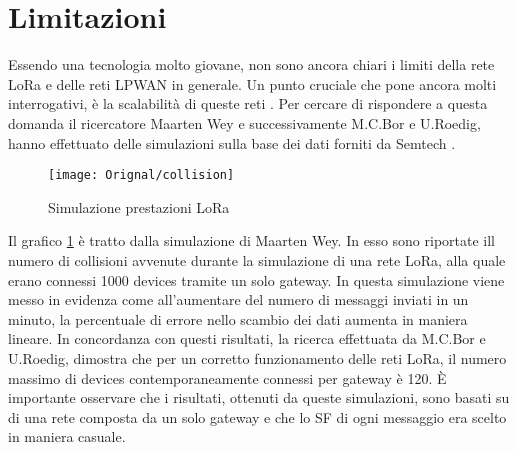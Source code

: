 \section{Limitazioni}
Essendo una tecnologia molto giovane, non sono ancora chiari i limiti della
rete LoRa e delle reti LPWAN in generale. 
Un punto cruciale che pone ancora molti interrogativi, è la scalabilità di
queste reti . Per cercare di rispondere a questa domanda il ricercatore Maarten Wey e
successivamente M.C.Bor e U.Roedig, hanno effettuato delle simulazioni sulla
base dei dati forniti da Semtech .
\begin{figure}[ht]
        \centering 
                \texttt{[image: Orignal/collision]}
        \caption{Simulazione prestazioni LoRa}
        \label{fig:collision}
\end{figure}
Il grafico \ref{fig:collision} è tratto dalla simulazione di Maarten
Wey. In esso sono riportate ill numero di collisioni
avvenute durante la simulazione di una rete LoRa, alla quale erano connessi 1000
devices tramite un solo gateway. In questa simulazione viene messo in evidenza
come all'aumentare del numero di messaggi inviati in un minuto, la percentuale
di errore nello scambio dei dati aumenta in maniera lineare.
In concordanza con questi risultati, la ricerca effettuata
da M.C.Bor e U.Roedig, dimostra che  per un corretto funzionamento delle reti
LoRa, il numero massimo di devices contemporaneamente connessi per gateway è 120.
È importante osservare che i risultati,
ottenuti da queste simulazioni, sono basati su di una rete composta da un solo
gateway e che lo SF di ogni messaggio era scelto in maniera casuale. 

